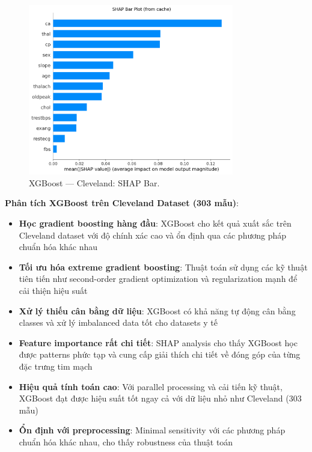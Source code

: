 \begin{figure}[H]
\centering
\includegraphics[width=0.8\textwidth]{Result/cleveland_dataset/XGBoost/SHAP/Bar.png}
\caption{XGBoost — Cleveland: SHAP Bar.}
\label{fig:xgb_clev_shap_bar}
\end{figure}

\textbf{Phân tích XGBoost trên Cleveland Dataset (303 mẫu)}:
\begin{itemize}[leftmargin=*]
    \item \textbf{Học gradient boosting hàng đầu}: XGBoost cho kết quả xuất sắc trên Cleveland dataset với độ chính xác cao và ổn định qua các phương pháp chuẩn hóa khác nhau
    \item \textbf{Tối ưu hóa extreme gradient boosting}: Thuật toán sử dụng các kỹ thuật tiên tiến như second-order gradient optimization và regularization mạnh để cải thiện hiệu suất
    \item \textbf{Xử lý thiếu cân bằng dữ liệu}: XGBoost có khả năng tự động cân bằng classes và xử lý imbalanced data tốt cho datasets y tế 
    \item \textbf{Feature importance rất chi tiết}: SHAP analysis cho thấy XGBoost học được patterns phức tạp và cung cấp giải thích chi tiết về đóng góp của từng đặc trưng tim mạch
    \item \textbf{Hiệu quả tính toán cao}: Với parallel processing và cải tiến kỹ thuật, XGBoost đạt được hiệu suất tốt ngay cả với dữ liệu nhỏ như Cleveland (303 mẫu)
    \item \textbf{Ổn định với preprocessing}: Minimal sensitivity với các phương pháp chuẩn hóa khác nhau, cho thấy robustness của thuật toán
\end{itemize}

